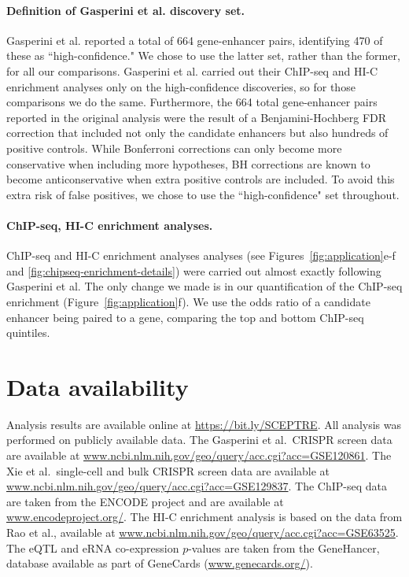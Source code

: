 \documentclass{nature}
\begin{document}
\paragraph{Definition of Gasperini et al. discovery set.}

Gasperini et al. reported a total of 664 gene-enhancer pairs, identifying 470 of these as ``high-confidence." We chose to use the latter set, rather than the former, for all our comparisons. Gasperini et al. carried out their ChIP-seq and HI-C enrichment analyses only on the high-confidence discoveries, so for those comparisons we do the same. Furthermore, the 664 total gene-enhancer pairs reported in the original analysis were the result of a Benjamini-Hochberg FDR correction that included not only the candidate enhancers but also hundreds of positive controls. While Bonferroni corrections can only become more conservative when including more hypotheses, BH corrections are known to become anticonservative when extra positive controls are included.\cite{FR01} To avoid this extra risk of false positives, we chose to use the ``high-confidence" set throughout.

\paragraph{ChIP-seq, HI-C enrichment analyses.}

ChIP-seq and HI-C enrichment analyses analyses (see Figures~\ref{fig:application}e-f and \ref{fig:chipseq-enrichment-details}) were carried out almost exactly following Gasperini et al. The only change we made is in our quantification of the ChIP-seq enrichment (Figure~\ref{fig:application}f). We use the odds ratio of a candidate enhancer being paired to a gene, comparing the top and bottom ChIP-seq quintiles.

\clearpage
\section*{Data availability}

Analysis results are available online at \url{https://bit.ly/SCEPTRE}. All analysis was performed on publicly available data. The Gasperini et al.\ CRISPR screen data\cite{Gasperini2019} are available at \url{www.ncbi.nlm.nih.gov/geo/query/acc.cgi?acc=GSE120861}. The Xie et al.\ single-cell and bulk CRISPR screen data are available at \url{www.ncbi.nlm.nih.gov/geo/query/acc.cgi?acc=GSE129837}. The ChIP-seq data are taken from the ENCODE project\cite{Dunham2012} and are available at \url{www.encodeproject.org/}. The HI-C enrichment analysis is based on the data from Rao et al.,\cite{Rao2014} available at \url{www.ncbi.nlm.nih.gov/geo/query/acc.cgi?acc=GSE63525}. The eQTL and eRNA co-expression $p$-values are taken from the GeneHancer, database\cite{Fishilevich2017} available as part of GeneCards (\url{www.genecards.org/}).
\end{document}
